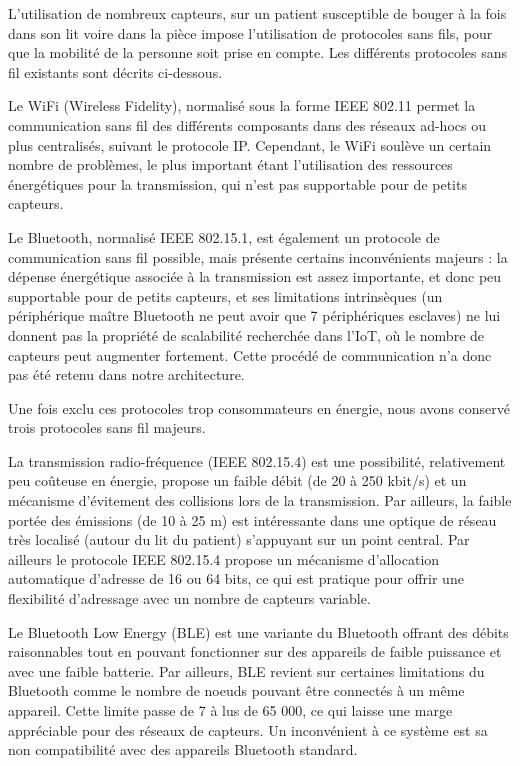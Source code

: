 \documentclass{article}
\begin{document}
L’utilisation de nombreux capteurs, sur un patient susceptible de bouger à la fois dans son lit voire dans la pièce impose l’utilisation de protocoles sans fils, pour que la mobilité de la personne soit prise en compte. Les différents protocoles sans fil existants sont décrits ci-dessous.

Le WiFi (Wireless Fidelity), normalisé sous la forme IEEE 802.11 permet la communication sans fil des différents composants dans des réseaux ad-hocs ou plus centralisés, suivant le protocole IP. Cependant, le WiFi soulève un certain nombre de problèmes, le plus important étant l'utilisation des ressources énergétiques pour la transmission, qui n’est pas supportable pour de petits capteurs.

Le Bluetooth, normalisé IEEE 802.15.1, est également un protocole de communication sans fil possible, mais présente certains inconvénients majeurs : la dépense énergétique associée à la transmission est assez importante, et donc peu supportable pour de petits capteurs, et ses limitations intrinsèques (un périphérique maître Bluetooth ne peut avoir que 7 périphériques esclaves) ne lui donnent pas la propriété de scalabilité recherchée dans l'IoT, où le nombre de capteurs peut augmenter fortement. Cette procédé de communication n'a donc pas été retenu dans notre architecture.

Une fois exclu ces protocoles trop consommateurs en énergie, nous avons conservé trois protocoles sans fil majeurs.

La transmission radio-fréquence (IEEE 802.15.4) est une possibilité, relativement peu coûteuse en énergie, propose un faible débit (de 20 à 250 kbit/s) et un mécanisme d’évitement des collisions lors de la transmission. Par ailleurs, la faible portée des émissions (de 10 à 25 m) est intéressante dans une optique de réseau très localisé (autour du lit du patient) s’appuyant sur un point central. Par ailleurs le protocole IEEE 802.15.4 propose un mécanisme d’allocation automatique d’adresse de 16 ou 64 bits, ce qui est pratique pour offrir une flexibilité d’adressage avec un nombre de capteurs variable.

Le Bluetooth Low Energy (BLE) est une variante du Bluetooth offrant des débits raisonnables tout en pouvant fonctionner sur des appareils de faible puissance et avec une faible batterie. Par ailleurs, BLE revient sur certaines limitations du Bluetooth comme le nombre de noeuds pouvant être connectés à un même appareil. Cette limite passe de 7 à lus de 65 000, ce qui laisse une marge appréciable pour des réseaux de capteurs. Un inconvénient à ce système est sa non compatibilité avec des appareils Bluetooth standard.
\end{document}
